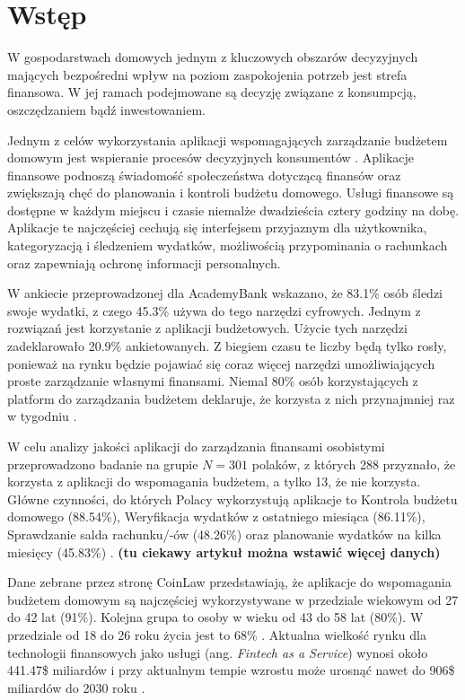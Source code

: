\chapter{Wstęp}
W gospodarstwach domowych jednym z kluczowych obszarów decyzyjnych mających bezpośredni wpływ na poziom zaspokojenia potrzeb jest strefa finansowa. W jej ramach podejmowane są decyzję związane z konsumpcją, oszczędzaniem bądź inwestowaniem.

Jednym z celów wykorzystania aplikacji wspomagających zarządzanie budżetem domowym jest wspieranie procesów decyzyjnych konsumentów \cite{Robo-Advisory}. Aplikacje finansowe podnoszą świadomość społeczeństwa dotyczącą finansów oraz zwiększają chęć do planowania i kontroli budżetu domowego. Usługi finansowe są dostępne w każdym miejscu i czasie niemalże dwadzieścia cztery godziny na dobę. Aplikacje te najczęściej cechują się interfejsem przyjaznym dla użytkownika, kategoryzacją i śledzeniem wydatków, możliwością przypominania o rachunkach oraz zapewniają ochronę informacji personalnych.

W ankiecie przeprowadzonej dla AcademyBank wskazano, że 83.1\% osób śledzi swoje wydatki, z czego 45.3\% używa do tego narzędzi cyfrowych. Jednym z rozwiązań jest korzystanie z aplikacji budżetowych. Użycie tych narzędzi zadeklarowało 20.9\% ankietowanych. Z biegiem czasu te liczby będą tylko rosły, ponieważ na rynku będzie pojawiać się coraz więcej narzędzi umożliwiających proste zarządzanie własnymi finansami. Niemal 80\% osób korzystających z platform do zarządzania budżetem deklaruje, że korzysta z nich przynajmniej raz w tygodniu \cite{AcademyBank}.

W celu analizy jakości aplikacji do zarządzania finansami osobistymi przeprowadzono badanie na grupie $N=301$ polaków, z których 288 przyznało, że korzysta z aplikacji do wspomagania budżetem, a tylko 13, że nie korzysta. Główne czynności, do których Polacy wykorzystują aplikacje to Kontrola budżetu domowego (88.54\%), Weryfikacja wydatków z ostatniego miesiąca (86.11\%), Sprawdzanie salda rachunku/-ów (48.26\%) oraz planowanie wydatków na kilka miesięcy (45.83\%) \cite{PFMApp}. \textbf{(tu ciekawy artykuł można wstawić więcej danych)}

Dane zebrane przez stronę CoinLaw przedstawiają, że aplikacje do wspomagania budżetem domowym są najczęściej wykorzystywane w przedziale wiekowym od 27 do 42 lat (91\%). Kolejna grupa to osoby w wieku od 43 do 58 lat (80\%). W przedziale od 18 do 26 roku życia jest to 68\% \cite{FintechStats}. Aktualna wielkość rynku dla technologii finansowych jako usługi (ang. \textit{Fintech as a Service}) wynosi około 441.47\$ miliardów i przy aktualnym tempie wzrostu może urosnąć nawet do 906\$ miliardów do 2030 roku \cite{FaaS}.


